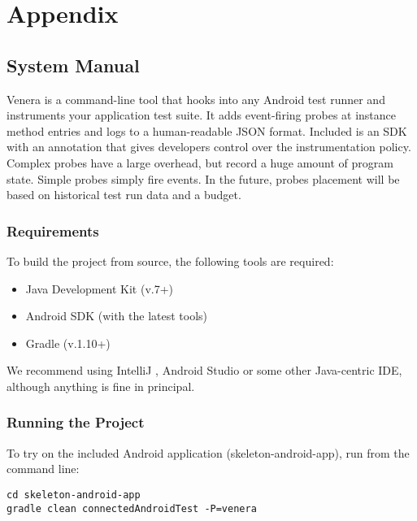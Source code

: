 \section{Appendix}
\label{sec:appendix}

\subsection{\venera System Manual}

Venera is a command-line tool that hooks into any Android test runner and
instruments your application test suite. It adds event-firing probes at instance
method entries and logs to a human-readable JSON format. Included is an SDK with
an annotation that gives developers control over the instrumentation policy.
Complex probes have a large overhead, but record a huge amount of program state.
Simple probes simply fire events. In the future, probes placement will be based
on historical test run data and a budget.

\subsubsection{Requirements}

To build the project from source, the following tools are required:

\begin{itemize}
  \item Java Development Kit (v.7+) \cite{jdk}
  \item Android SDK (with the latest tools) \cite{androidSDK}
  \item Gradle (v.1.10+) \cite{gradle}
\end{itemize}

We recommend using IntelliJ \cite{intellij}, Android Studio \cite{androidStudio}
or some other Java-centric IDE, although anything is fine in principal.

\subsubsection{Running the Project}

To try \venera on the included Android application (skeleton-android-app), run
from the command line:

\begin{lstlisting}[numbers=none]
cd skeleton-android-app
gradle clean connectedAndroidTest -P=venera
\end{lstlisting}

